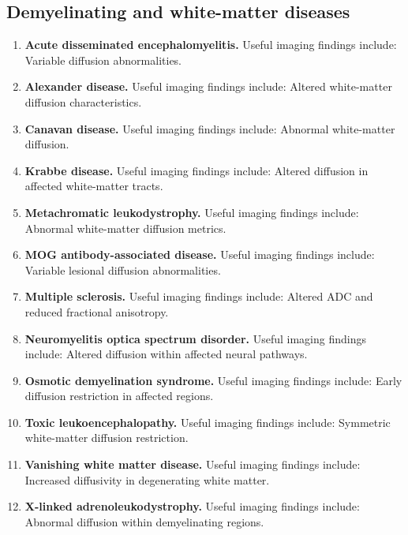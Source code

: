 \subsection{Demyelinating and white-matter diseases}
\begin{enumerate}[leftmargin=*,itemsep=0.45em,topsep=0.4em]
\item \textbf{Acute disseminated encephalomyelitis.} Useful imaging findings include: Variable diffusion abnormalities.
\item \textbf{Alexander disease.} Useful imaging findings include: Altered white-matter diffusion characteristics.
\item \textbf{Canavan disease.} Useful imaging findings include: Abnormal white-matter diffusion.
\item \textbf{Krabbe disease.} Useful imaging findings include: Altered diffusion in affected white-matter tracts.
\item \textbf{Metachromatic leukodystrophy.} Useful imaging findings include: Abnormal white-matter diffusion metrics.
\item \textbf{MOG antibody-associated disease.} Useful imaging findings include: Variable lesional diffusion abnormalities.
\item \textbf{Multiple sclerosis.} Useful imaging findings include: Altered ADC and reduced fractional anisotropy.
\item \textbf{Neuromyelitis optica spectrum disorder.} Useful imaging findings include: Altered diffusion within affected neural pathways.
\item \textbf{Osmotic demyelination syndrome.} Useful imaging findings include: Early diffusion restriction in affected regions.
\item \textbf{Toxic leukoencephalopathy.} Useful imaging findings include: Symmetric white-matter diffusion restriction.
\item \textbf{Vanishing white matter disease.} Useful imaging findings include: Increased diffusivity in degenerating white matter.
\item \textbf{X-linked adrenoleukodystrophy.} Useful imaging findings include: Abnormal diffusion within demyelinating regions.
\end{enumerate}

